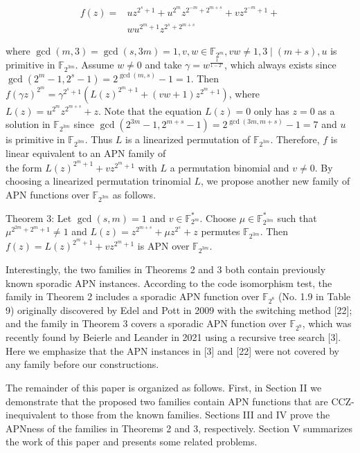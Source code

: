 \documentclass[10pt]{article}
\begin{document}
$$
\begin{aligned}
f(z)= & u z^{2^{s}+1}+u^{2^{m}} z^{2^{-m}+2^{m+s}}+v z^{2^{-m}+1}+ \\
& w u^{2^{m}+1} z^{2^{s}+2^{m+s}}
\end{aligned}
$$

where $\operatorname{gcd}(m, 3)=\operatorname{gcd}(s, 3 m)=1, v, w \in \mathbb{F}_{2^{m}}, v w \neq 1,3 \mid (m+s), u$ is primitive in $\mathbb{F}_{2^{3 m}}$. Assume $w \neq 0$ and take $\gamma=w^{\frac{1}{1-2^{s}}}$, which always exists since $\operatorname{gcd}\left(2^{m}-1,2^{s}-1\right)= 2^{\operatorname{gcd}(m, s)}-1=1$. Then $f(\gamma z)^{2^{m}}=\gamma^{2^{s}+1}\left(L(z)^{2^{m}+1}+\right. \left.(v w+1) z^{2^{m}+1}\right)$, where $L(z)=u^{2^{m}} z^{2^{m+s}}+z$. Note that the equation $L(z)=0$ only has $z=0$ as a solution in $\mathbb{F}_{2^{3 m}}$ since $\operatorname{gcd}\left(2^{3 m}-1,2^{m+s}-1\right)=2^{\operatorname{gcd}(3 m, m+s)}-1=7$ and $u$ is primitive in $\mathbb{F}_{2^{3 m}}$. Thus $L$ is a linearized permutation of $\mathbb{F}_{2^{3 m}}$. Therefore, $f$ is linear equivalent to an APN family of\\
the form $L(z)^{2^{m}+1}+v z^{2^{m}+1}$ with $L$ a permutation binomial and $v \neq 0$. By choosing a linearized permutation trinomial $L$, we propose another new family of APN functions over $\mathbb{F}_{2^{3 m}}$ as follows.

Theorem 3: Let $\operatorname{gcd}(s, m)=1$ and $v \in \mathbb{F}_{2^{m}}^{*}$. Choose $\mu \in \mathbb{F}_{2^{3 m}}^{*}$ such that $\mu^{2^{2 m}+2^{m}+1} \neq 1$ and $L(z)=z^{2^{m+s}}+\mu z^{2^{s}}+z$ permutes $\mathbb{F}_{2^{3 m}}$. Then $f(z)=L(z)^{2^{m}+1}+v z^{2^{m}+1}$ is APN over $\mathbb{F}_{2^{3 m}}$.

Interestingly, the two families in Theorems 2 and 3 both contain previously known sporadic APN instances. According to the code isomorphism test, the family in Theorem 2 includes a sporadic APN function over $\mathbb{F}_{2^{8}}$ (No. 1.9 in Table 9) originally discovered by Edel and Pott in 2009 with the switching method [22]; and the family in Theorem 3 covers a sporadic APN function over $\mathbb{F}_{2^{9}}$, which was recently found by Beierle and Leander in 2021 using a recursive tree search [3]. Here we emphasize that the APN instances in [3] and [22] were not covered by any family before our constructions.

The remainder of this paper is organized as follows. First, in Section II we demonstrate that the proposed two families contain APN functions that are CCZ-inequivalent to those from the known families. Sections III and IV prove the APNness of the families in Theorems 2 and 3, respectively. Section V summarizes the work of this paper and presents some related problems.
\end{document}
